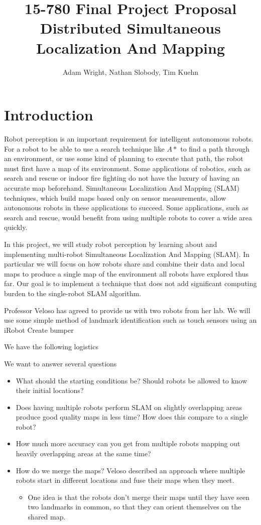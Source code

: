 \documentclass[11pt]{article}
\title{
15-780 Final Project Proposal \\ 
Distributed Simultaneous Localization And Mapping \\
}
\author{Adam Wright, Nathan Slobody, Tim Kuehn}
\begin{document}
\maketitle

\section{Introduction}

Robot perception is an important requirement for intelligent autonomous robots. For a robot to be able to use a search technique like $A*$ to find a path through an environment, or use some kind of planning to execute that path, the robot must first have a map of its environment. Some applications of robotics, such as search and rescue or indoor fire fighting do not have the luxury of having an accurate map beforehand. Simultaneous Localization And Mapping (SLAM) techniques, which build maps based only on sensor measurements, allow autonomous robots in these applications to succeed. Some applications, such as search and rescue, would benefit from using multiple robots to cover a wide area quickly. 

In this project, we will study robot perception by learning about and implementing multi-robot Simultaneous Localization And Mapping (SLAM). In particular we will focus on how robots share and combine their data and local maps to produce a single map of the environment all robots have explored thus far. Our goal is to implement a technique that does not add significant computing burden to the single-robot SLAM algorithm.

Professor Veloso has agreed to provide us with two robots from her lab. We will use some simple method of landmark identification such as touch sensors using an iRobot Create bumper 

We have the following logistics

We want to answer several questions

\begin{itemize}
    \item What should the starting conditions be? Should robots be allowed to know their initial locations?

    \item Does having multiple robots perform SLAM on slightly overlapping areas produce good quality maps in less time? How does this compare to a single robot?

    \item How much more accuracy can you get from multiple robots mapping out heavily overlapping areas at the same time?

    \item How do we merge the maps? Veloso described an approach where multiple robots start in different locations and fuse their maps when they meet.
        \begin{itemize}
            \item One idea is that the robots don't merge their maps until they have seen two landmarks in common, so that they can orient themselves on the shared map.
        \end{itemize}

\end{itemize}
\end{document}
